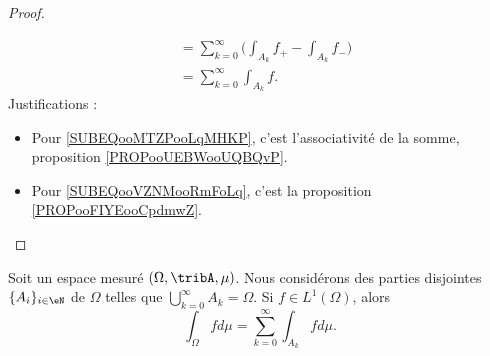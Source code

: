 \begin{proof}
\begin{subproof}
\begin{subequations}
\begin{align}
				                                      & =\sum_{k=0}^{\infty}\big( \int_{A_k}f_+-\int_{A_k}f_- \big)        \label{SUBEQooMTZPooLqMHKP} \\
				                                      & =\sum_{k=0}^{\infty}\int_{A_k}f.       \label{SUBEQooVZNMooRmFoLq}
			\end{align}
		\end{subequations}
		Justifications :
		\begin{itemize}
			\item Pour \eqref{SUBEQooMTZPooLqMHKP}, c'est l'associativité de la somme, proposition \ref{PROPooUEBWooUQBQvP}.
			\item Pour \eqref{SUBEQooVZNMooRmFoLq}, c'est la proposition \ref{PROPooFIYEooCpdmwZ}.
		\end{itemize}
	\end{subproof}
\end{proof}

\begin{proposition}     \label{PROPooDWYNooWKJmEV}
	Soit un espace mesuré \( (\Omega,\tribA,\mu)\). Nous considérons des parties disjointes \( \{ A_i \}_{i\in \eN}\) de \( \Omega\) telles que \( \bigcup_{k=0}^{\infty}A_k=\Omega\). Si \( f\in L^1(\Omega)\), alors
	\begin{equation}
		\int_{\Omega}fd\mu=\sum_{k=0}^{\infty}\int_{A_k}fd\mu.
	\end{equation}
\end{proposition}

